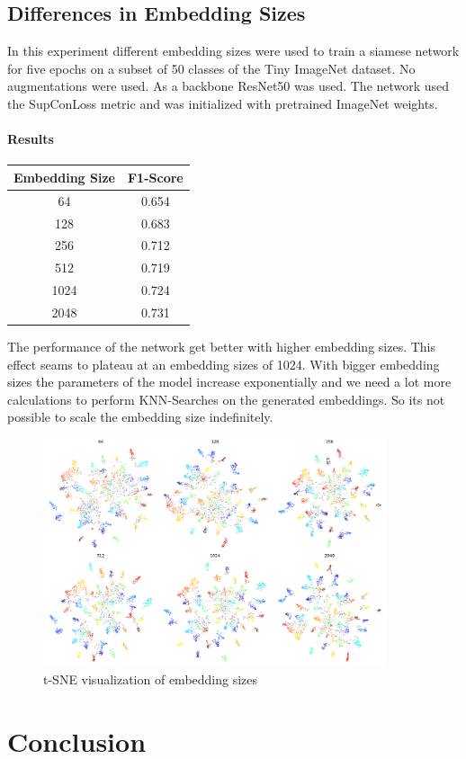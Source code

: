 \documentclass[12pt,a4paper]{report}
\begin{document}
\newpage

\section{Differences in Embedding Sizes}

In this experiment different embedding sizes were used to train a siamese network for five epochs on a subset of 50 classes of the Tiny ImageNet dataset.
No augmentations were used.
As a backbone ResNet50 was used.
The network used the SupConLoss metric and was initialized with pretrained ImageNet weights.


\subsubsection*{Results}
\begin{table}
	\begin{tabular}{ | c | c | }
		\hline
		Embedding Size &  F1-Score \\ 
		\hline
		64 &  0.654 \\ 
		\hline
		128 & 0.683 \\ 
		\hline
		256 & 0.712 \\ 
		\hline
		512 & 0.719 \\ 
		\hline
		1024 & 0.724  \\ 
		\hline
		2048 & 0.731 \\ 
		\hline
	\end{tabular}
\end{table} 

The performance of the network get better with higher embedding sizes.
This effect seams to plateau at an embedding sizes of 1024.
With bigger embedding sizes the parameters of the model increase exponentially and we need a lot more calculations to perform KNN-Searches on the generated embeddings.
So its not possible to scale the embedding size indefinitely.

\vspace{0.5cm}

\begin{figure}[h]
	\centering
	\includegraphics[width=0.9\textwidth]{../plots/embedding_size.png}
	\caption{t-SNE visualization of embedding sizes}
\end{figure}


\chapter{Conclusion}

\newpage


\end{document}
